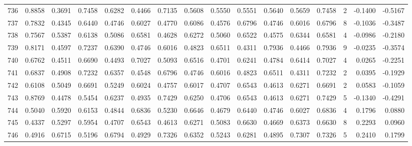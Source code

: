 \begin{tabular}{lrrrrrrrrrrrrrrr}
736 &      0.8858 &  0.3691 &  0.7458 &  0.6282 &  0.4466 &  0.7135 &  0.5608 &  0.5550 &  0.5551 &  0.5640 &   0.5659 &     0.7458 &      2 &                   -0.1400 &                    -0.5167 \\
737 &      0.7832 &  0.4345 &  0.6440 &  0.4746 &  0.6027 &  0.4770 &  0.6086 &  0.4576 &  0.6796 &  0.4746 &   0.6016 &     0.6796 &      8 &                   -0.1036 &                    -0.3487 \\
738 &      0.7567 &  0.5387 &  0.6138 &  0.5086 &  0.6581 &  0.4628 &  0.6272 &  0.5060 &  0.6522 &  0.4575 &   0.6344 &     0.6581 &      4 &                   -0.0986 &                    -0.2180 \\
739 &      0.8171 &  0.4597 &  0.7237 &  0.6390 &  0.4746 &  0.6016 &  0.4823 &  0.6511 &  0.4311 &  0.7936 &   0.4466 &     0.7936 &      9 &                   -0.0235 &                    -0.3574 \\
740 &      0.6762 &  0.4511 &  0.6690 &  0.4493 &  0.7027 &  0.5093 &  0.6516 &  0.4701 &  0.6241 &  0.4784 &   0.6414 &     0.7027 &      4 &                    0.0265 &                    -0.2251 \\
741 &      0.6837 &  0.4908 &  0.7232 &  0.6357 &  0.4548 &  0.6796 &  0.4746 &  0.6016 &  0.4823 &  0.6511 &   0.4311 &     0.7232 &      2 &                    0.0395 &                    -0.1929 \\
742 &      0.6108 &  0.5049 &  0.6691 &  0.5249 &  0.6024 &  0.4757 &  0.6017 &  0.4707 &  0.6543 &  0.4613 &   0.6271 &     0.6691 &      2 &                    0.0583 &                    -0.1059 \\
743 &      0.8769 &  0.4478 &  0.5454 &  0.6237 &  0.4935 &  0.7429 &  0.6250 &  0.4706 &  0.6543 &  0.4613 &   0.6271 &     0.7429 &      5 &                   -0.1340 &                    -0.4291 \\
744 &      0.5040 &  0.5920 &  0.6153 &  0.4844 &  0.6836 &  0.5230 &  0.6646 &  0.4679 &  0.6440 &  0.4746 &   0.6027 &     0.6836 &      4 &                    0.1796 &                     0.0880 \\
745 &      0.4337 &  0.5297 &  0.5954 &  0.4707 &  0.6543 &  0.4613 &  0.6271 &  0.5083 &  0.6630 &  0.4669 &   0.6373 &     0.6630 &      8 &                    0.2293 &                     0.0960 \\
746 &      0.4916 &  0.6715 &  0.5196 &  0.6794 &  0.4929 &  0.7326 &  0.6352 &  0.5243 &  0.6281 &  0.4895 &   0.7307 &     0.7326 &      5 &                    0.2410 &                     0.1799 \\

\end{tabular}
